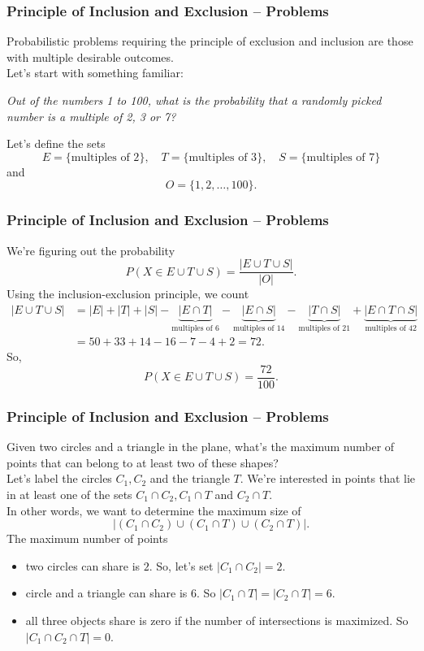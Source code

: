 \documentclass[aspectratio=169,11pt,usenames,dvipsnames]{beamer}
\begin{document}
\begin{frame}
 \frametitle{Principle of Inclusion and Exclusion -- Problems}
 Probabilistic problems requiring the \alert{principle of exclusion and
 inclusion} are those with multiple desirable outcomes.\pause\\
 Let's start with something familiar:
 \begin{center}
  \emph{Out of the numbers 1 to 100, what is the probability that a randomly
  picked number is a multiple of 2, 3 or 7?}
 \end{center}
 \pause
 Let's define the sets
 \[
  E = \{\text{multiples of 2}\}, \quad T = \{\text{multiples of 3}\}, \quad S =
  \{\text{multiples of 7}\}
 \]
 \pause
 and
 \[
  O = \{1,2,\ldots,100\}.
 \]
\end{frame}

\begin{frame}
 \frametitle{Principle of Inclusion and Exclusion -- Problems}
 We're figuring out the probability
 \[
  P(X \in E \cup T \cup S) = \frac{|E \cup T \cup S|}{|O|}.
 \]
 \pause
 Using the \alert{inclusion-exclusion principle}, we count
 \begin{align*}
  |E \cup T \cup S| &= |E| + |T| + |S| - \underbrace{|E \cap
  T|}_{\text{multiples of $6$}} - \underbrace{|E \cap S|}_{\text{multiples of
  $14$}} - \underbrace{|T \cap S|}_{\text{multiples of $21$}} + \underbrace{|E \cap T \cap
  S|}_{\text{multiples of $42$}} \\
                    &= 50 + 33 + 14 - 16 - 7 - 4 + 2 = 72.
 \end{align*}
 \pause
 So,
 \[
  P(X \in E \cup T \cup S) = \frac{72}{100}.
 \]
\end{frame}

\begin{frame}
 \frametitle{Principle of Inclusion and Exclusion -- Problems}
 Given two circles and a triangle in the plane, what's the maximum number of
 points that can belong to at least two of these shapes?\pause\\
 Let's label the circles $C_1,C_2$ and the triangle $T$. \pause
 We're interested in points that lie in \alert{at least one} of the sets $C_1
 \cap C_2, C_1 \cap T$ and $C_2 \cap T$.\pause\\
 In other words, we want to determine the maximum size of
 \[
  |(C_1 \cap C_2) \cup (C_1 \cap T) \cup (C_2 \cap T)|.
 \]
 \pause
 The maximum number of points
 \begin{itemize}
  \item two circles can share is $2$. So, let's set $|C_1 \cap C_2| = 2$.
  \pause
  \item circle and a triangle can share is $6$. So $|C_1 \cap T| = |C_2 \cap T|
   = 6$.
  \pause
  \item all three objects share is zero if the number of intersections is
   maximized. So $|C_1 \cap C_2 \cap T| = 0$.
 \end{itemize}
\end{frame}
\end{document}
